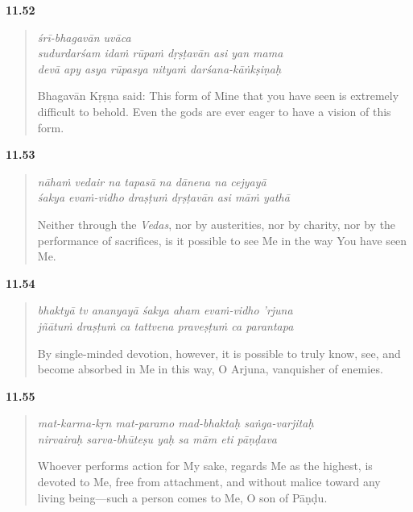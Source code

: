 \par\noindent\textbf{11.52}\par
\begin{verse}
\textit{śrī-bhagavān uvāca} \\
\textit{sudurdarśam idaṁ rūpaṁ dṛṣṭavān asi yan mama} \\
\textit{devā apy asya rūpasya nityaṁ darśana-kāṅkṣiṇaḥ}

\noindent Bhagavān Kṛṣṇa said: This form of Mine that you have seen is extremely difficult to behold. Even the gods are ever eager to have a vision of this form.
\end{verse}
\par



\par\noindent\textbf{11.53}\par
\begin{verse}
\textit{nāhaṁ vedair na tapasā na dānena na cejyayā} \\
\textit{śakya evaṁ-vidho draṣṭuṁ dṛṣṭavān asi māṁ yathā}

\noindent Neither through the \textit{Vedas}, nor by austerities, nor by charity, nor by the performance of sacrifices, is it possible to see Me in the way You have seen Me.
\end{verse}
\par



\par\noindent\textbf{11.54}\par
\begin{verse}
\textit{bhaktyā tv ananyayā śakya aham evaṁ-vidho ’rjuna} \\
\textit{jñātuṁ draṣṭuṁ ca tattvena praveṣṭuṁ ca parantapa}

\noindent By single-minded devotion, however, it is possible to truly know, see, and become absorbed in Me in this way, O Arjuna, vanquisher of enemies.
\end{verse}
\par



\par\noindent\textbf{11.55}\par
\begin{verse}
\textit{mat-karma-kṛn mat-paramo mad-bhaktaḥ saṅga-varjitaḥ} \\
\textit{nirvairaḥ sarva-bhūteṣu yaḥ sa mām eti pāṇḍava}

\noindent Whoever performs action for My sake, regards Me as the highest, is devoted to Me, free from attachment, and without malice toward any living being---such a person comes to Me, O son of Pāṇḍu.
\end{verse}
\par



